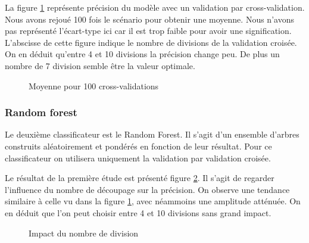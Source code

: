 \documentclass[11pt,a4paper]{article}
\begin{document}
			La figure \ref{cv_dt} représente précision du modèle avec un validation par cross-validation. Nous avons rejoué 100 fois le scénario pour obtenir une moyenne. Nous n'avons pas représenté l'écart-type ici car il est trop faible pour avoir une signification. L'abscisse de cette figure indique le nombre de divisions de la validation croisée.
			On en déduit qu'entre 4 et 10 divisions la précision change peu. De plus un nombre de 7 division semble être la valeur optimale.

			\begin{figure}
			\begin{center}
				\caption{Moyenne pour 100 cross-validations}
				\label{cv_dt}
			\end{center}
			\end{figure}


		\subsubsection{Random forest}
		
			Le deuxième classificateur est le Random Forest. Il s'agit d'un ensemble d'arbres construits aléatoirement et pondérés en fonction de leur résultat. Pour ce classificateur on utilisera uniquement la validation par validation croisée.

			Le résultat de la première étude est présenté figure \ref{random_forest}. Il s'agit de regarder l'influence du nombre de découpage sur la précision. On observe une tendance similaire à celle vu dans la figure \ref{cv_dt}, avec néammoins une amplitude atténuée. On en déduit que l'on peut choisir entre 4 et 10 divisions sans grand impact.


			\begin{figure}
			\begin{center}
				\caption{Impact du nombre de division}
				\label{random_forest}
			\end{center}
			\end{figure}
\end{document}
